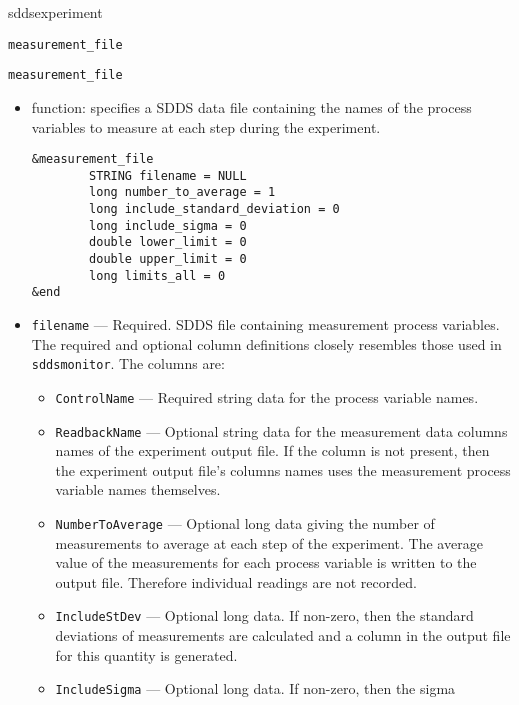 \begin{sddsprog}{sddsexperiment}
\begin{itemize}
\begin{latexonly}
\newpage\begin{center}{\Large \verb+measurement_file+}\end{center}
\end{latexonly}
\begin{htmlonly}
\item {\Large \verb+measurement_file+}
\end{htmlonly}
\begin{itemize}
        \item function: specifies a SDDS data file containing the names of
                 the process variables to measure at each step during the experiment.
\begin{verbatim}
&measurement_file
        STRING filename = NULL
        long number_to_average = 1
        long include_standard_deviation = 0
        long include_sigma = 0
        double lower_limit = 0
        double upper_limit = 0
        long limits_all = 0
&end
\end{verbatim}
        \item {\verb+filename+} --- Required. SDDS file containing measurement process variables.
                The required and optional column definitions closely resembles those used in {\verb+sddsmonitor+}.
                The columns are:
        \begin{itemize}
                \item {\verb+ControlName+} --- Required string data for the process variable names.
                \item {\verb+ReadbackName+} --- Optional string data for the measurement data
                columns names of the experiment output file. If the column is not present, then the
                experiment output file's columns names uses the measurement process variable names themselves.
                \item {\verb+NumberToAverage+} --- Optional long data giving the number of measurements
                to average at each step of the experiment. The average value of the measurements for each
                process variable is written to the output file. Therefore individual readings are not recorded.
                \item {\verb+IncludeStDev+} --- Optional long data. If non-zero, then the standard
                deviations of measurements are calculated and a column in the output file for this quantity
                is generated.
                \item {\verb+IncludeSigma+} --- Optional long data.  If non-zero, then the sigma

\end{itemize}
\end{itemize}
\end{itemize}
\end{sddsprog}
